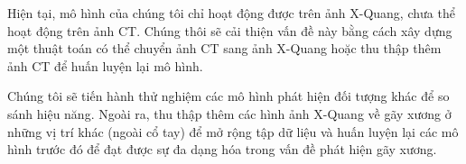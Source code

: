\documentclass[../the.tex]{subfiles}
\begin{document}
{\fontsize{13}{12} \selectfont
Hiện tại, mô hình của chúng tôi chỉ hoạt động được trên ảnh X-Quang, chưa thể hoạt động trên ảnh CT. Chúng thôi sẽ cải thiện vấn đề này bằng cách xây dựng một thuật toán có thể chuyển ảnh CT sang ảnh X-Quang hoặc thu thập thêm ảnh CT để huấn luyện lại mô hình. 

Chúng tôi sẽ tiến hành thử nghiệm các mô hình phát hiện đối tượng khác để so sánh hiệu năng. Ngoài ra, thu thập thêm các hình ảnh X-Quang về gãy xương ở những vị trí khác (ngoài cổ tay) để mở rộng tập dữ liệu và huấn luyện lại các mô hình trước đó để đạt được sự đa dạng hóa trong vấn đề phát hiện gãy xương.
}
\end{document}
